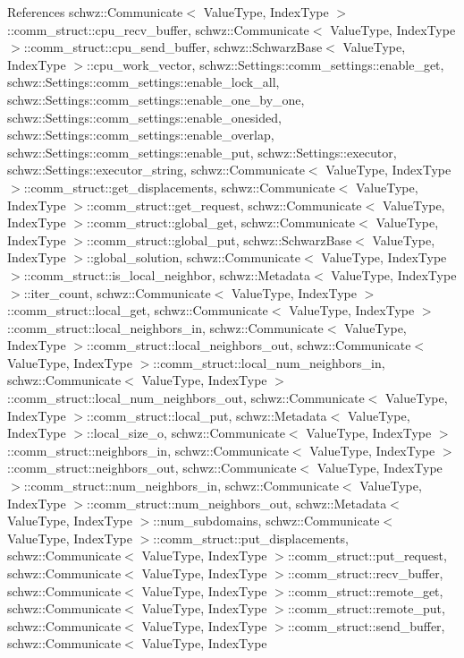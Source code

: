References schwz\+::\+Communicate$<$ Value\+Type, Index\+Type $>$\+::comm\+\_\+struct\+::cpu\+\_\+recv\+\_\+buffer, schwz\+::\+Communicate$<$ Value\+Type, Index\+Type $>$\+::comm\+\_\+struct\+::cpu\+\_\+send\+\_\+buffer, schwz\+::\+Schwarz\+Base$<$ Value\+Type, Index\+Type $>$\+::cpu\+\_\+work\+\_\+vector, schwz\+::\+Settings\+::comm\+\_\+settings\+::enable\+\_\+get, schwz\+::\+Settings\+::comm\+\_\+settings\+::enable\+\_\+lock\+\_\+all, schwz\+::\+Settings\+::comm\+\_\+settings\+::enable\+\_\+one\+\_\+by\+\_\+one, schwz\+::\+Settings\+::comm\+\_\+settings\+::enable\+\_\+onesided, schwz\+::\+Settings\+::comm\+\_\+settings\+::enable\+\_\+overlap, schwz\+::\+Settings\+::comm\+\_\+settings\+::enable\+\_\+put, schwz\+::\+Settings\+::executor, schwz\+::\+Settings\+::executor\+\_\+string, schwz\+::\+Communicate$<$ Value\+Type, Index\+Type $>$\+::comm\+\_\+struct\+::get\+\_\+displacements, schwz\+::\+Communicate$<$ Value\+Type, Index\+Type $>$\+::comm\+\_\+struct\+::get\+\_\+request, schwz\+::\+Communicate$<$ Value\+Type, Index\+Type $>$\+::comm\+\_\+struct\+::global\+\_\+get, schwz\+::\+Communicate$<$ Value\+Type, Index\+Type $>$\+::comm\+\_\+struct\+::global\+\_\+put, schwz\+::\+Schwarz\+Base$<$ Value\+Type, Index\+Type $>$\+::global\+\_\+solution, schwz\+::\+Communicate$<$ Value\+Type, Index\+Type $>$\+::comm\+\_\+struct\+::is\+\_\+local\+\_\+neighbor, schwz\+::\+Metadata$<$ Value\+Type, Index\+Type $>$\+::iter\+\_\+count, schwz\+::\+Communicate$<$ Value\+Type, Index\+Type $>$\+::comm\+\_\+struct\+::local\+\_\+get, schwz\+::\+Communicate$<$ Value\+Type, Index\+Type $>$\+::comm\+\_\+struct\+::local\+\_\+neighbors\+\_\+in, schwz\+::\+Communicate$<$ Value\+Type, Index\+Type $>$\+::comm\+\_\+struct\+::local\+\_\+neighbors\+\_\+out, schwz\+::\+Communicate$<$ Value\+Type, Index\+Type $>$\+::comm\+\_\+struct\+::local\+\_\+num\+\_\+neighbors\+\_\+in, schwz\+::\+Communicate$<$ Value\+Type, Index\+Type $>$\+::comm\+\_\+struct\+::local\+\_\+num\+\_\+neighbors\+\_\+out, schwz\+::\+Communicate$<$ Value\+Type, Index\+Type $>$\+::comm\+\_\+struct\+::local\+\_\+put, schwz\+::\+Metadata$<$ Value\+Type, Index\+Type $>$\+::local\+\_\+size\+\_\+o, schwz\+::\+Communicate$<$ Value\+Type, Index\+Type $>$\+::comm\+\_\+struct\+::neighbors\+\_\+in, schwz\+::\+Communicate$<$ Value\+Type, Index\+Type $>$\+::comm\+\_\+struct\+::neighbors\+\_\+out, schwz\+::\+Communicate$<$ Value\+Type, Index\+Type $>$\+::comm\+\_\+struct\+::num\+\_\+neighbors\+\_\+in, schwz\+::\+Communicate$<$ Value\+Type, Index\+Type $>$\+::comm\+\_\+struct\+::num\+\_\+neighbors\+\_\+out, schwz\+::\+Metadata$<$ Value\+Type, Index\+Type $>$\+::num\+\_\+subdomains, schwz\+::\+Communicate$<$ Value\+Type, Index\+Type $>$\+::comm\+\_\+struct\+::put\+\_\+displacements, schwz\+::\+Communicate$<$ Value\+Type, Index\+Type $>$\+::comm\+\_\+struct\+::put\+\_\+request, schwz\+::\+Communicate$<$ Value\+Type, Index\+Type $>$\+::comm\+\_\+struct\+::recv\+\_\+buffer, schwz\+::\+Communicate$<$ Value\+Type, Index\+Type $>$\+::comm\+\_\+struct\+::remote\+\_\+get, schwz\+::\+Communicate$<$ Value\+Type, Index\+Type $>$\+::comm\+\_\+struct\+::remote\+\_\+put, schwz\+::\+Communicate$<$ Value\+Type, Index\+Type $>$\+::comm\+\_\+struct\+::send\+\_\+buffer, schwz\+::\+Communicate$<$ Value\+Type, Index\+Type 
